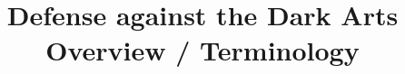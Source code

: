 \graphicspath{{./figures/}}
\title{Defense against the Dark Arts \\ Overview / Terminology}
\date{}



